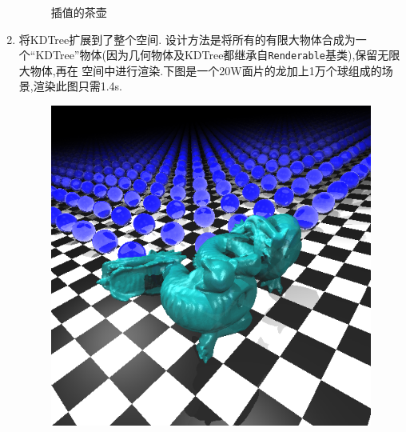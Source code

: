 \begin{enumerate}
\begin{figure}[H]
\begin{minipage}[b]{0.46\linewidth}
      \end{minipage}
      \caption{插值的茶壶\label{fig:smooth}}
    \end{figure}

  \item 将KDTree扩展到了整个空间.
    设计方法是将所有的有限大物体合成为一个``KDTree''物体(因为几何物体及KDTree都继承自\verb|Renderable|基类),保留无限大物体,再在
    空间中进行渲染.下图是一个20W面片的龙加上1万个球组成的场景,渲染此图只需1.4s.
    \begin{figure}[H]
      \centering
      \includegraphics[scale=0.4]{img/dragonball.png}
      \caption*{\label{fig:dragonball}}
    \end{figure}


\end{enumerate}
